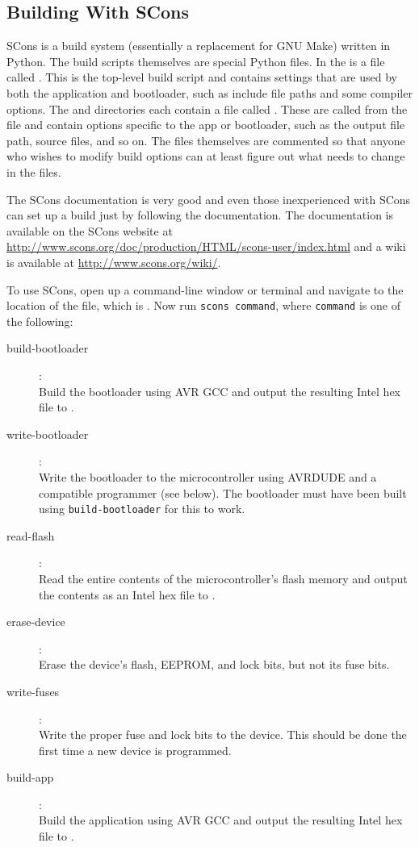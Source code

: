 \documentclass{article}
\newcommand{\abrackets}[1]{\textlangle #1\textrangle}
\begin{document}
\subsection{Building With SCons} \label{ssec:FWBuilding}
SCons is a build system (essentially a replacement for GNU Make) written in Python.  The build
scripts themselves are special Python files.  In the  is a file called
.  This is the top-level build script and contains settings that are used by both
the application and bootloader, such as include file paths and some compiler options.  The
 and  directories each contain a file called
.  These are called from the  file and contain options
specific to the app or bootloader, such as the output file path, source files, and so on.  The files
themselves are commented so that anyone who wishes to modify build options can at least figure out
what needs to change in the files.

The SCons documentation is very good and even those inexperienced with SCons can set up a build just
by following the documentation.  The documentation is available on the SCons website at
\url{http://www.scons.org/doc/production/HTML/scons-user/index.html} and a wiki is available at
\url{http://www.scons.org/wiki/}.

To use SCons, open up a command-line window or terminal and navigate to the location of the
 file, which is .  Now run \texttt{scons \abrackets{command}},
where \texttt{\abrackets{command}} is one of the following:

\begin{description}
  \item[build-bootloader]: \\
    Build the bootloader using AVR GCC and output the resulting Intel hex file to
    .
  \item[write-bootloader]: \\
    Write the bootloader to the microcontroller using AVRDUDE and a compatible programmer (see
    below).  The bootloader must have been built using \texttt{build-bootloader} for this to work.
  \item[read-flash]: \\
    Read the entire contents of the microcontroller's flash memory and output the contents as an
    Intel hex file to .
  \item[erase-device]: \\
    Erase the device's flash, EEPROM, and lock bits, but not its fuse bits.
  \item[write-fuses]: \\
    Write the proper fuse and lock bits to the device.  This should be done the first time a new
    device is programmed.
  \item[build-app]: \\
    Build the application using AVR GCC and output the resulting Intel hex file to
    .
\end{description}
\end{document}
